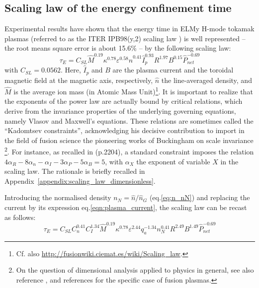 \subsection{Scaling law of the energy confinement time}
\label{sec:scaling_law}

Experimental results have shown that the energy time in ELMy H-mode tokamak plasmas (referred to as the ITER IPB98(y,2) scaling law \cite[eq.(20)]{ITERphysics_chap2}) is well represented -- the root means square error is about 15.6\% -- by the following scaling law:
\begin{equation*}
  \label{eq:scaling_law_IPB98(y,2)}
  \tau_E = C_{SL} \hat M^{0.19} \kappa^{0.78} \varepsilon^{0.58} 
  \hat n^{0.41} \hat I_p^{0.93} R^{1.97} B^{0.15}  \hat P_{net}^{-0.69}
\end{equation*}
with $C_{SL} = 0.0562$.
Here, $\hat I_p$ and $B$ are the plasma current and the toroidal magnetic field at the magnetic axis, respectively, $\hat n$ the line-averaged density, and $\hat M$ is the average ion mass (in Atomic Mass Unit)\footnote{Cf. also \url{http://fusionwiki.ciemat.es/wiki/Scaling_law}.}. 
It is important to realize that the exponents of the power law are actually bound by critical relations, which derive from the invariance properties of the underlying governing equations, namely Vlasov and Maxwell's equations. These relations are sometimes called the ``Kadomtsev constraints'', acknowledging his decisive contribution \cite{Kadomtsev1975} to import in the field of fusion science the pioneering works of Buckingham on scale invariance \cite{Buckingham1914}\footnote{On the question of dimensional analysis applied to physics in general, see also reference \cite{Misic2010}, and references \cite{Connor1977, Luce2008} for the specific case of fusion plasmas.}. For instance, as recalled in \cite{ITERphysics_chap2} (p.2204), a standard constraint imposes the relation 
$4\alpha_R - 8\alpha_n - \alpha_I - 3\alpha_P - 5\alpha_B = 5$, with $\alpha_X$ the exponent of variable $X$ in the scaling law. The rationale is briefly recalled in Appendix~\ref{appendix:scaling_law_dimensionless}.

Introducing the normalised density $n_N = \hat n/\hat n_G$ (eq.\ref{eq:n_nN}) and replacing the current by its expression eq.\ref{eqn:plasma_current}, the scaling law can be recast as follows:
\begin{equation*}
  \tau_E = C_{SL} C_n^{0.41} C_I^{1.34} \hat M^{0.19} \kappa^{0.78} \varepsilon^{2.44} q_a^{-1.34}
  n_N^{0.41} R^{2.49} B^{1.49} \hat P_{net}^{-0.69}
\end{equation*}

